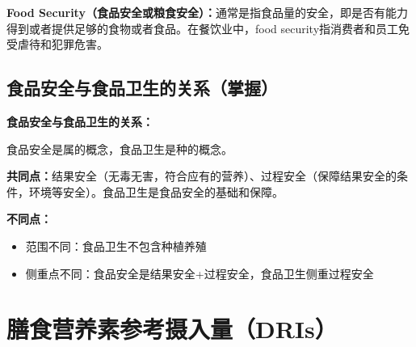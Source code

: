 \begin{tipbox}
\textbf{Food Security（食品安全或粮食安全）：}通常是指食品量的安全，即是否有能力得到或者提供足够的食物或者食品。在餐饮业中，food security指消费者和员工免受虐待和犯罪危害。
\end{tipbox}

\subsection{食品安全与食品卫生的关系（掌握）}

\begin{keybox}
\textbf{食品安全与食品卫生的关系：}

食品安全是属的概念，食品卫生是种的概念。

\textbf{共同点：}结果安全（无毒无害，符合应有的营养）、过程安全（保障结果安全的条件，环境等安全）。食品卫生是食品安全的基础和保障。

\textbf{不同点：}
\begin{itemize}[leftmargin=*]
    \item 范围不同：食品卫生不包含种植养殖
    \item 侧重点不同：食品安全是结果安全+过程安全，食品卫生侧重过程安全
\end{itemize}
\end{keybox}

\section{膳食营养素参考摄入量（DRIs）}

